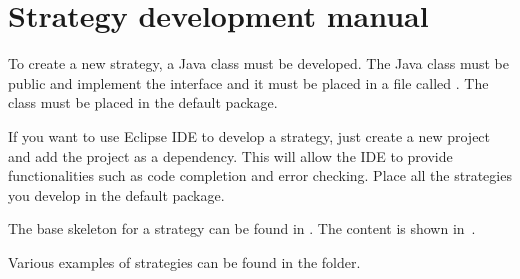 \chapter{Strategy development manual}\label{appendix:devman}

To create a new strategy, a Java class must be developed. The Java class must
be public and implement the  interface and
it must be placed in a file called . The class must be
placed in the default package.

If you want to use Eclipse IDE to develop a strategy, just create a new project
and add the  project as a dependency. This will allow the IDE to
provide functionalities such as code completion and error checking. Place all
the strategies you develop in the default package.

The base skeleton for a strategy can be found in .
The content is shown in~.

Various examples of strategies can be found in the  folder.


